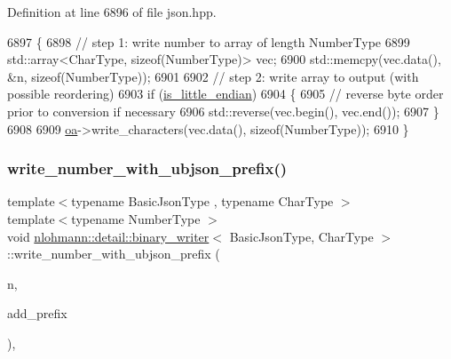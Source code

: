 Definition at line 6896 of file json.\+hpp.


\begin{DoxyCode}
6897     \{
6898         \textcolor{comment}{// step 1: write number to array of length NumberType}
6899         std::array<CharType, sizeof(NumberType)> vec;
6900         std::memcpy(vec.data(), &n, \textcolor{keyword}{sizeof}(NumberType));
6901 
6902         \textcolor{comment}{// step 2: write array to output (with possible reordering)}
6903         \textcolor{keywordflow}{if} (\hyperlink{classnlohmann_1_1detail_1_1binary__writer_a048887c907afe39759b777e8c888414c}{is\_little\_endian})
6904         \{
6905             \textcolor{comment}{// reverse byte order prior to conversion if necessary}
6906             std::reverse(vec.begin(), vec.end());
6907         \}
6908 
6909         \hyperlink{classnlohmann_1_1detail_1_1binary__writer_a6f15b782a7900f50ef37d123008e601b}{oa}->write\_characters(vec.data(), \textcolor{keyword}{sizeof}(NumberType));
6910     \}
\end{DoxyCode}
\mbox{\label{classnlohmann_1_1detail_1_1binary__writer_a6a40756933ccc4f69e3d885fe2e9032b}} 
\subsubsection{\texorpdfstring{write\+\_\+number\+\_\+with\+\_\+ubjson\+\_\+prefix()}{write\_number\_with\_ubjson\_prefix()}}
{\footnotesize\ttfamily template$<$typename Basic\+Json\+Type , typename Char\+Type $>$ \\
template$<$typename Number\+Type $>$ \\
void \hyperlink{classnlohmann_1_1detail_1_1binary__writer}{nlohmann\+::detail\+::binary\+\_\+writer}$<$ Basic\+Json\+Type, Char\+Type $>$\+::write\+\_\+number\+\_\+with\+\_\+ubjson\+\_\+prefix (\begin{DoxyParamCaption}\item[{const Number\+Type}]{n,  }\item[{const bool}]{add\+\_\+prefix }\end{DoxyParamCaption})\hspace{0.3cm}{\ttfamily [inline]}, {\ttfamily [private]}}



